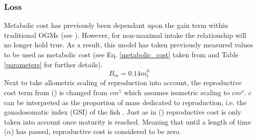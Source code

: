 \documentclass[a4paper, 11pt, hidelinks]{article} %
\begin{document}
	\subsubsection{Loss}
	Metabolic cost  has previously been dependant upon the gain term within traditional OGMs (see \cite{West2001, Hou2008}).  However, for non-maximal intake the relationship will no longer hold true.  As a result, this model has taken previously measured values to be used as metabolic cost (see Eq. \ref{metabolic_cost} taken from \cite{Peters1983} %
	and Table \ref{parameters} for further details).
	\begin{equation}
		\label{metabolic_cost}
		B_m = 0.14 m_t^\mu
	\end{equation}
	Next to take allometric scaling of reproduction into account, the reproductive cost term from \citeauthor{Charnov2001} (\citeyear{Charnov2001}) is changed from $cm^1$ which assumes isometric scaling to $cm^\rho$.  $c$ can be interpreted as the proportion of mass dedicated to reproduction, i.e. the gonadosomatic index (GSI) of the fish \parencite{Charnov2001}.  Just as in \citeauthor{Charnov2001} (\citeyear{Charnov2001}) reproductive cost is only taken into account once maturity is reached.  Meaning that until a length of time ($\alpha$) has passed, reproductive cost is considered to be zero.
	

	
	
\end{document}

